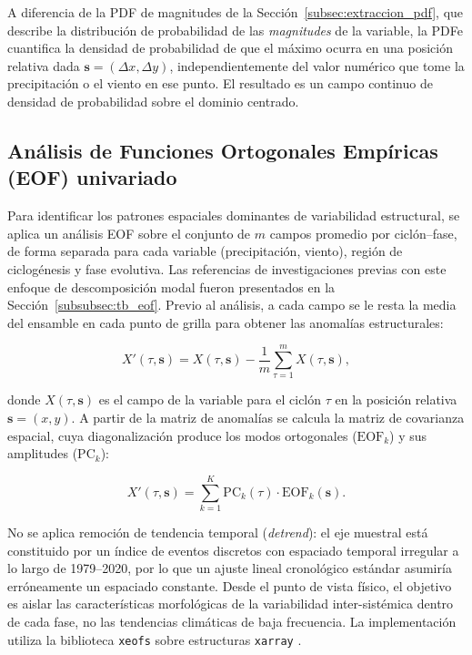 A diferencia de la PDF de magnitudes de la Sección~\ref{subsec:extraccion_pdf}, que describe la distribución de probabilidad de las \emph{magnitudes} de la variable, la PDFe cuantifica la densidad de probabilidad de que el máximo ocurra en una posición relativa dada $\mathbf{s} = (\Delta x, \Delta y)$, independientemente del valor numérico que tome la precipitación o el viento en ese punto. El resultado es un campo continuo de densidad de probabilidad sobre el dominio centrado.

\subsection{Análisis de Funciones Ortogonales Empíricas (EOF) univariado}\label{subsec:eof_univariado}

Para identificar los patrones espaciales dominantes de variabilidad estructural, se aplica un análisis EOF sobre el conjunto de $m$ campos promedio por ciclón--fase, de forma separada para cada variable (precipitación, viento), región de ciclogénesis y fase evolutiva. Las referencias de investigaciones previas con este enfoque de descomposición modal fueron presentados en la Sección~\ref{subsubsec:tb_eof}. Previo al análisis, a cada campo se le resta la media del ensamble en cada punto de grilla para obtener las anomalías estructurales:

\begin{equation}
    X'(\tau, \mathbf{s}) = X(\tau, \mathbf{s}) - \frac{1}{m}\sum_{\tau=1}^{m}X(\tau, \mathbf{s}),
\end{equation}

donde $X(\tau, \mathbf{s})$ es el campo de la variable para el ciclón $\tau$ en la posición relativa $\mathbf{s} = (x,y)$. A partir de la matriz de anomalías se calcula la matriz de covarianza espacial, cuya diagonalización produce los modos ortogonales ($\text{EOF}_k$) y sus amplitudes ($\text{PC}_k$):

\begin{equation}
    X'(\tau, \mathbf{s}) = \sum_{k=1}^{K} \text{PC}_k(\tau) \cdot \text{EOF}_k(\mathbf{s}).
\end{equation}

No se aplica remoción de tendencia temporal (\textit{detrend}): el eje muestral está constituido por un índice de eventos discretos con espaciado temporal irregular a lo largo de 1979--2020, por lo que un ajuste lineal cronológico estándar asumiría erróneamente un espaciado constante. Desde el punto de vista físico, el objetivo es aislar las características morfológicas de la variabilidad inter-sistémica dentro de cada fase, no las tendencias climáticas de baja frecuencia. La implementación utiliza la biblioteca \texttt{xeofs} \citep{rieger2024xeofs} sobre estructuras \texttt{xarray} \citep{hoyer2017xarray}.

